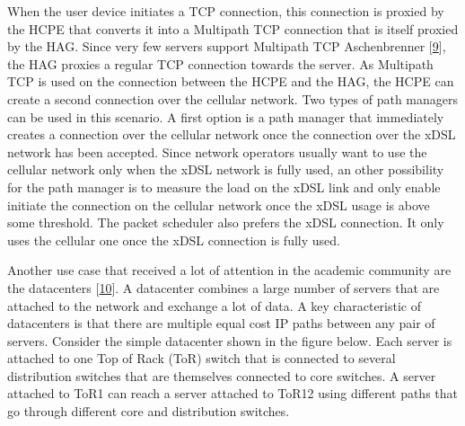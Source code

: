 \documentclass[letterpaper,10pt,english]{sphinxmanual}
\begin{document}
\sphinxAtStartPar
When the user device initiates a TCP connection, this connection is proxied by the HCPE that converts it into a Multipath TCP connection that is itself proxied by the HAG. Since very few servers support Multipath TCP Aschenbrenner  {[}\hyperlink{cite.biblio:id9003}{9}{]}, the HAG proxies a regular TCP connection towards the server. As Multipath TCP is used on the connection between the HCPE and the HAG, the HCPE can create a second connection over the cellular network. Two types of path managers can be used in this scenario. A first option is a path manager that immediately creates a connection over the cellular network once the connection over the xDSL network has been accepted. Since network operators usually want to use the cellular network only when the xDSL network is fully used, an other possibility for the path manager is to measure the load on the xDSL link and only enable initiate the connection on the cellular network once the xDSL usage is above some threshold. The packet scheduler also prefers the xDSL connection. It only uses the cellular one once the xDSL connection is fully used.

\sphinxAtStartPar
Another use case that received a lot of attention in the academic community are the datacenters {[}\hyperlink{cite.biblio:id8933}{10}{]}. A datacenter combines a large number of servers that are attached to the network and exchange a lot of data. A key characteristic of datacenters is that there are multiple equal cost IP paths between any pair of servers. Consider the simple datacenter shown in the figure below. Each server is attached to one Top of Rack (ToR) switch that is connected to several distribution switches that are themselves connected to core switches. A server attached to ToR1 can reach a server attached to ToR12 using different paths that go through different core and distribution switches.
\end{document}
